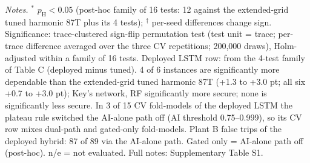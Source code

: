 \begin{table}[!htbp]
\vspace{3pt}\par\raggedright\scriptsize\textit{Notes.} $^{*}$ $p_{\mathrm{H}}<0.05$ (post-hoc family of 16 tests: 12 against the extended-grid tuned harmonic 87T plus its 4 tests); $^{\dagger}$ per-seed differences change sign. Significance: trace-clustered sign-flip permutation test (test unit = trace; per-trace difference averaged over the three CV repetitions; 200{,}000 draws), Holm-adjusted within a family of 16 tests. Deployed LSTM row: from the 4-test family of Table C (deployed minus tuned). 4 of 6 instances are significantly more dependable than the extended-grid tuned harmonic 87T (+1.3 to +3.0 pt; all six +0.7 to +3.0 pt); Key's network, RF significantly more secure; none is significantly less secure. In 3 of 15 CV fold-models of the deployed LSTM the plateau rule switched the AI-alone path off (AI threshold 0.75--0.999), so its CV row mixes dual-path and gated-only fold-models. Plant B false trips of the deployed hybrid: 87 of 89 via the AI-alone path. Gated only = AI-alone path off (post-hoc). n/e = not evaluated. Full notes: Supplementary Table S1.
\end{table}